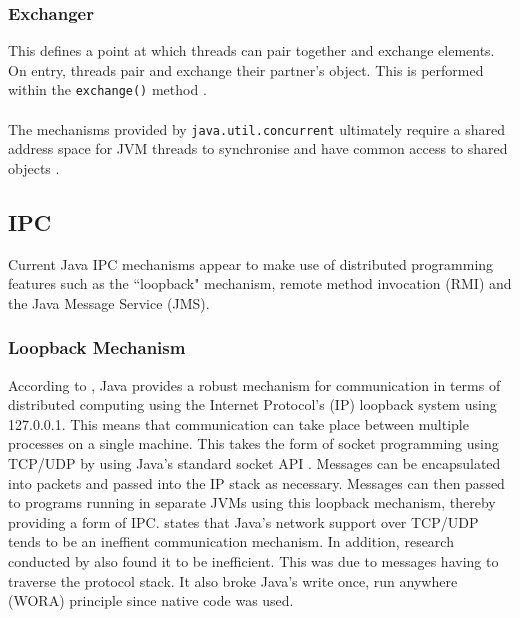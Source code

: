 \documentclass[12pt,a4paper,oneside]{article}
\def\code#1{\texttt{#1}}
\begin{document}
\begin{spacing}{1.4}
\subsubsection{Exchanger}
This defines a point at which threads can pair together and exchange elements. On entry, threads pair and exchange their partner's object. This is performed within the \code{exchange()} method \citep{JavaAPI}. 
\\\\
The mechanisms provided by \code{java.util.concurrent} ultimately require a shared address space for JVM threads to synchronise and have common access to shared objects \citep{WellsIPCMultiProc}.
\end{spacing}
\subsection{IPC}
\begin{spacing}{1.4}
Current Java IPC mechanisms appear to make use of distributed programming features such as the ``loopback" mechanism, remote method invocation (RMI) and the Java Message Service (JMS).
\end{spacing}
\subsubsection{Loopback Mechanism}
\begin{spacing}{1.4}
According to \cite{WellsIPCJava}, Java provides a robust mechanism for communication in terms of distributed computing using the Internet Protocol's (IP) loopback system using 127.0.0.1. This means that communication can take place between multiple processes on a single machine. This takes the form of socket programming using TCP/UDP by using Java's standard socket API \citep{taboada2013javaforHPC}. Messages can be encapsulated into packets and passed into the IP stack as necessary. Messages can then passed to programs running in separate JVMs using this loopback mechanism, thereby providing a form of IPC. \cite{taboada2013javaforHPC} states that Java's network support over TCP/UDP tends to be an ineffient communication mechanism. In addition, research conducted by \cite{WellsIPCMultiProc} also found it to be inefficient. This was due to messages having to traverse the protocol stack. It also broke Java's write once, run anywhere (WORA) principle since native code was used. 
\end{spacing}
\end{document}
